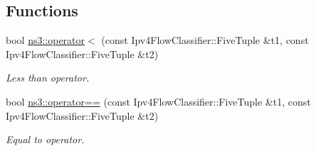 \subsection*{Functions}
\begin{DoxyCompactItemize}
\item 
bool \hyperlink{namespacens3_ae038403670f2dcdc43f5f36b2c0c78a9}{ns3\+::operator$<$} (const Ipv4\+Flow\+Classifier\+::\+Five\+Tuple \&t1, const Ipv4\+Flow\+Classifier\+::\+Five\+Tuple \&t2)
\begin{DoxyCompactList}\small\item\em Less than operator. \end{DoxyCompactList}\item 
bool \hyperlink{namespacens3_a22e1e264f3073029629ee0f132e558aa}{ns3\+::operator==} (const Ipv4\+Flow\+Classifier\+::\+Five\+Tuple \&t1, const Ipv4\+Flow\+Classifier\+::\+Five\+Tuple \&t2)
\begin{DoxyCompactList}\small\item\em Equal to operator. \end{DoxyCompactList}\end{DoxyCompactItemize}
